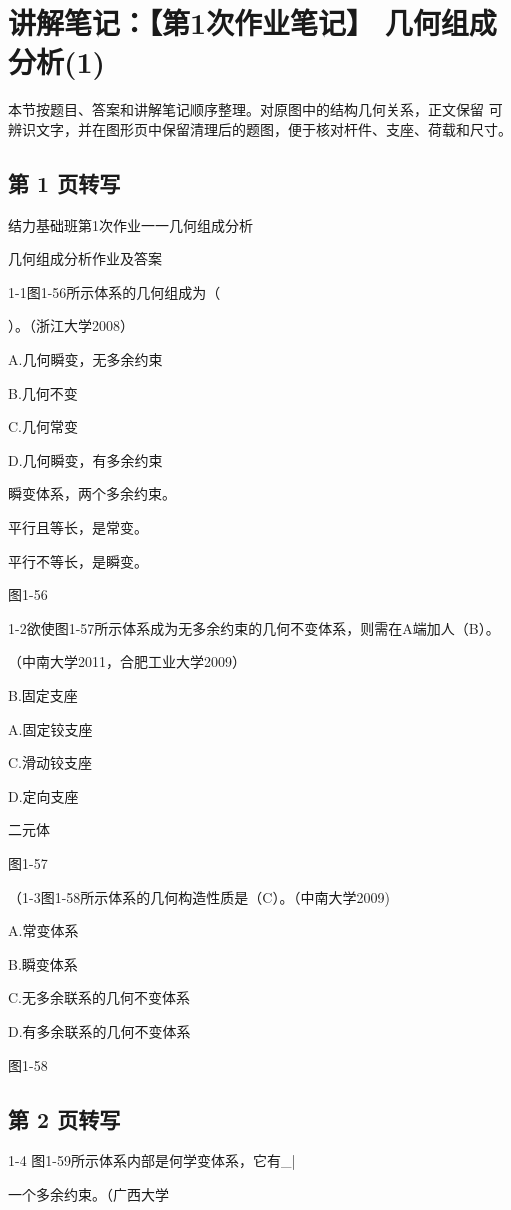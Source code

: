 \section{讲解笔记：【第1次作业笔记】 几何组成分析(1)}
\begin{analysisbox}
本节按题目、答案和讲解笔记顺序整理。对原图中的结构几何关系，正文保留 可辨识文字，并在图形页中保留清理后的题图，便于核对杆件、支座、荷载和尺寸。
\end{analysisbox}
\subsection*{第 1 页转写}
结力基础班第1次作业一一几何组成分析

几何组成分析作业及答案

1-1图1-56所示体系的几何组成为（

）。（浙江大学2008）

A.几何瞬变，无多余约束

B.几何不变

C.几何常变

D.几何瞬变，有多余约束

瞬变体系，两个多余约束。

平行且等长，是常变。

平行不等长，是瞬变。

图1-56

1-2欲使图1-57所示体系成为无多余约束的几何不变体系，则需在A端加人（B）。

（中南大学2011，合肥工业大学2009）

B.固定支座

A.固定铰支座

C.滑动铰支座

D.定向支座

二元体

图1-57

（1-3图1-58所示体系的几何构造性质是（C）。（中南大学2009)

A.常变体系

B.瞬变体系

C.无多余联系的几何不变体系

D.有多余联系的几何不变体系

图1-58

\subsection*{第 2 页转写}
1-4 图1-59所示体系内部是何学变体系，它有\_|

一个多余约束。（广西大学

